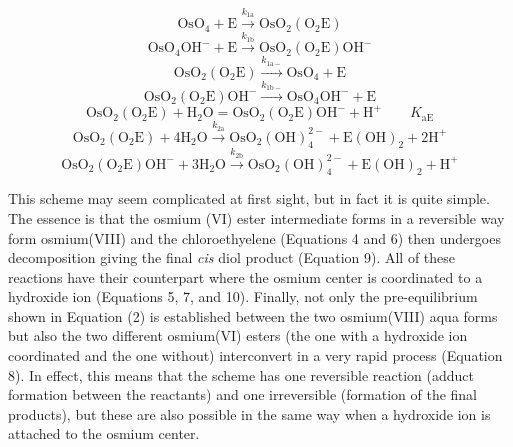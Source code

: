 \documentclass{article}
\begin{document}
\begin{equation}
\mathrm{OsO_4 + E} \xrightarrow{k_{\mathrm{1a}}} \mathrm{OsO_2(O_2E)} \tag{4}
\end{equation}
\begin{equation}
\mathrm{OsO_4OH^- + E} \xrightarrow{k_{\mathrm{1b}}} \mathrm{OsO_2(O_2E)OH^-} \tag{5}
\end{equation}
\begin{equation}
\mathrm{OsO_2(O_2E)} \xrightarrow{k_{\mathrm{1a-}}} \mathrm{OsO_4 + E} \tag{6}
\end{equation}
\begin{equation}
\mathrm{OsO_2(O_2E)OH^-} \xrightarrow{k_{\mathrm{1b-}}} \mathrm{OsO_4OH^- + E} \tag{7}
\end{equation}
\begin{equation}
\mathrm{OsO_2(O_2E) + H_2O = OsO_2(O_2E)OH^- + H^+} \qquad K_{\mathrm{aE}} \tag{8}
\end{equation}
\begin{equation}
\mathrm{OsO_2(O_2E) + 4H_2O} \xrightarrow{k_{\mathrm{2a}}} \mathrm{OsO_2(OH)_4^{2-} + E(OH)_2 + 2H^+} \tag{9}
\end{equation}
\begin{equation}
\mathrm{OsO_2(O_2E)OH^- + 3H_2O} \xrightarrow{k_{\mathrm{2b}}} \mathrm{OsO_2(OH)_4^{2-} + E(OH)_2 + H^+} \tag{10}
\end{equation}

This scheme may seem complicated at first sight, but in fact it is quite simple. The essence is that the osmium (VI) ester intermediate forms in a reversible way form osmium(VIII) and the chloroethyelene (Equations 4 and 6) then undergoes decomposition giving the final \emph{cis} diol product (Equation 9). All of these reactions have their counterpart where the osmium center is coordinated to a hydroxide ion (Equations 5, 7, and 10). Finally, not only the pre-equilibrium shown in Equation (2) is established between the two osmium(VIII) aqua forms but also the two different osmium(VI) esters (the one with a hydroxide ion coordinated and the one without) interconvert in a very rapid process (Equation 8). In effect, this means that the scheme has one reversible reaction (adduct formation between the reactants) and one irreversible (formation of the final products), but these are also possible in the same way when a hydroxide ion is attached to the osmium center.
\end{document}
